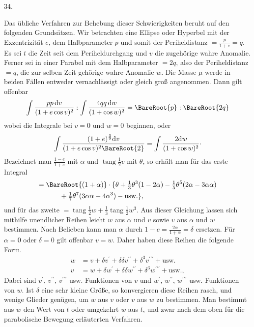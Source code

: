 \par{}
\begin{center}
\hypertarget{native-051-article034}{}34.
\end{center}
Das übliche Verfahren zur Behebung dieser Schwierigkeiten beruht auf den folgenden Grundsätzen. Wir betrachten eine Ellipse oder Hyperbel mit der Exzentrizität $e$, dem Halbparameter $p$ und somit der Periheldistanz $=\frac{p}{1+e}=q$. Es sei $t$ die Zeit seit dem Periheldurchgang und $v$ die zugehörige wahre Anomalie. Ferner sei in einer Parabel mit dem Halbparameter $=2q$, also der Periheldistanz $=q$, die zur selben Zeit gehörige wahre Anomalie $w$. Die Masse $\mu$ werde in beiden Fällen entweder vernachlässigt oder gleich groß angenommen. Dann gilt offenbar
\[
\int\frac{pp\,\mathrm{d}v}{(1+e\cos v)^2}:\int\frac{4qq\,\mathrm{d}w}{(1+\cos w)^2}=\BareRoot{p}:\BareRoot{2q}
\]
wobei die Integrale bei $v=0$ und $w=0$ beginnen, oder
\[
\int\frac{(1+e)^{\frac{3}{2}}\mathrm{d}v}{(1+e\cos v)^2\BareRoot{2}}=\int\frac{2\mathrm{d}w}{(1+\cos w)^2}\raisebox{.45ex}{.}
\]
Bezeichnet man $\frac{1-e}{1+e}$ mit $\alpha$ und $\operatorname{tang}\frac{1}{2}v$ mit $\theta$, so erhält man für das erste Integral
\[
\begin{aligned}
={}&\BareRoot{(1+\alpha)}\cdot\{\theta+\tfrac{1}{3}\theta^3(1-2\alpha)-\tfrac{1}{5}\theta^5(2\alpha-3\alpha\alpha)\\
&\qquad+\tfrac{1}{7}\theta^7(3\alpha\alpha-4\alpha^3)-\text{usw.}\},
\end{aligned}
\]
und für das zweite $=\operatorname{tang}\frac{1}{2}w+\frac{1}{3}\operatorname{tang}\frac{1}{2}w^3$. Aus dieser Gleichung lassen sich mithilfe unendlicher Reihen leicht $w$ aus $\alpha$ und $v$ sowie $v$ aus $\alpha$ und $w$ bestimmen. Nach Belieben kann man $\alpha$ durch $1-e=\frac{2\alpha}{1+\alpha}=\delta$ ersetzen. Für $\alpha=0$ oder $\delta=0$ gilt offenbar $v=w$. Daher haben diese Reihen die folgende Form.
\[
\begin{aligned}
w&=v+\delta v^{\prime}+\delta\delta v^{\prime\prime}+\delta^3v^{\prime\prime\prime}+\text{usw.}\\
v&=w+\delta w^{\prime}+\delta\delta w^{\prime\prime}+\delta^3w^{\prime\prime\prime}+\text{usw.},
\end{aligned}
\]
Dabei sind $v^{\prime}$, $v^{\prime\prime}$, $v^{\prime\prime\prime}$ usw. Funktionen von $v$ und $w^{\prime}$, $w^{\prime\prime}$, $w^{\prime\prime\prime}$ usw. Funktionen von $w$. Ist $\delta$ eine sehr kleine Größe, so konvergieren diese Reihen rasch, und wenige Glieder genügen, um $w$ aus $v$ oder $v$ aus $w$ zu bestimmen. Man bestimmt aus $w$ den Wert von $t$ oder umgekehrt $w$ aus $t$, und zwar nach dem oben für die parabolische Bewegung erläuterten Verfahren.
